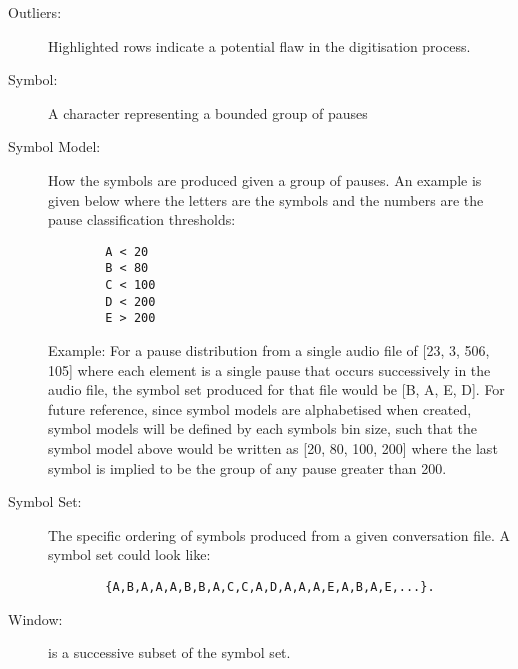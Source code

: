 \begin{description}
	\item[Outliers:] Highlighted rows indicate a potential flaw in the digitisation process. 
	
	
	\item[Symbol:] A character representing a bounded group of pauses
	
	\item[Symbol Model:] How the symbols are produced given a group of pauses. 
		An example is given below where the letters are the symbols and the numbers 
		are the pause classification thresholds:
	\begin{verbatim}
		A < 20 
		B < 80 
		C < 100  
		D < 200 
		E > 200 
	\end{verbatim}
	Example: For a pause distribution from a single audio file of [23, 3, 506, 105] 
	where each element is a single pause that occurs successively in the audio file, 
	the symbol set produced for that file would be [B, A, E, D]. 
	For future reference, since symbol models are alphabetised when created, symbol models will be 
	defined by each symbols bin size, such that the symbol model above would be written as [20, 80, 100, 200] 
	where the last symbol is implied to be the group of any pause greater than 200. 
	
	\item[Symbol Set:] The specific ordering of symbols produced from a given conversation file. A symbol set could look like: 
	\begin{verbatim}
		{A,B,A,A,A,B,B,A,C,C,A,D,A,A,A,E,A,B,A,E,...}.
	\end{verbatim}
	
	
	
	
	\item[Window:] is a successive subset of the symbol set. 
	

	

	
	

	
	

\end{description}